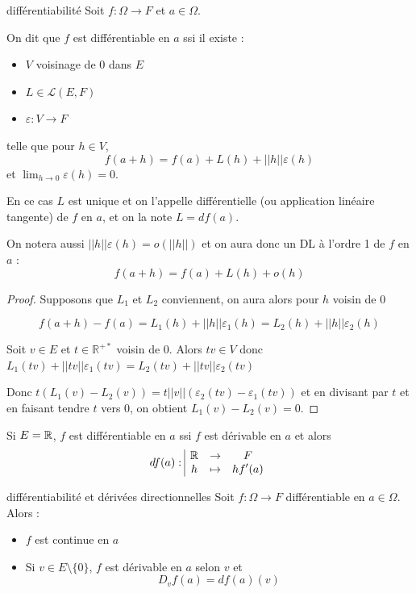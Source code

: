 \begin{theoreme}{différentiabilité}{}
    Soit $f : \Omega \to F$ et $a \in \Omega$. 

    On dit que $f$ est différentiable en $a$ ssi il existe : 
    \begin{itemize}
        \item $V$ voisinage de $0$ dans $E$
        \item $L \in \mathscr L(E, F)$
        \item $\varepsilon : V \to F$
    \end{itemize}

    telle que pour $h \in V$, 
    $$f(a + h) = f(a) + L(h) + ||h||\varepsilon(h)$$
    et $\displaystyle \lim_{h \to 0} \varepsilon(h) = 0$.

    En ce cas $L$ est unique et on l'appelle différentielle (ou application linéaire 
    tangente) de $f$ en $a$, et on  la note $L = df(a)$.

    On notera aussi $||h|| \varepsilon(h) = o(||h||)$ et on aura donc un DL 
    à l'ordre 1 de $f$ en $a$ :
    $$f(a + h) = f(a) + L(h) + o(h)$$
\end{theoreme}

\begin{proof}
    Supposons que $L_1$ et $L_2$ conviennent, on aura alors pour $h$ voisin de $0$ 
    
    $$f(a + h) - f(a) = L_1(h) + ||h|| \varepsilon_1(h) = L_2(h) + ||h|| \varepsilon_2(h)$$

    Soit $v \in E$ et $t \in \mathbb R^{+*}$ voisin de $0$. Alors 
    $tv \in V$ donc $L_1(tv) + ||tv|| \varepsilon_1(tv) = L_2(tv) + ||tv|| \varepsilon_2(tv)$

    Donc $t (L_1(v) - L_2(v)) = t ||v|| (\varepsilon_2(tv) - \varepsilon_1(tv))$
    et en divisant par $t$ et en faisant tendre $t$ vers $0$, on obtient $L_1(v) - L_2(v) = 0$.
\end{proof}

\begin{remarque}
    Si $E = \mathbb{R}$, $f$ est différentiable en $a$ ssi $f$ est dérivable en $a$ et alors 
    $$df(a): \space \begin{array}{|ccc} \displaystyle \mathbb{R} & \to & \displaystyle F \\ \displaystyle h & \mapsto & \displaystyle h f'(a) \end{array}$$
\end{remarque}

\begin{proposition}{différentiabilité et dérivées directionnelles}{}
    Soit $f : \Omega \to F$ différentiable en $a \in \Omega$. Alors : 
    \begin{itemize}
        \item $f$ est continue en $a$
        \item Si $v \in E \setminus \{0\}$, $f$ est dérivable en $a$ selon $v$ et 
        $$D_v f(a) = df(a)(v)$$
    \end{itemize}
\end{proposition}

